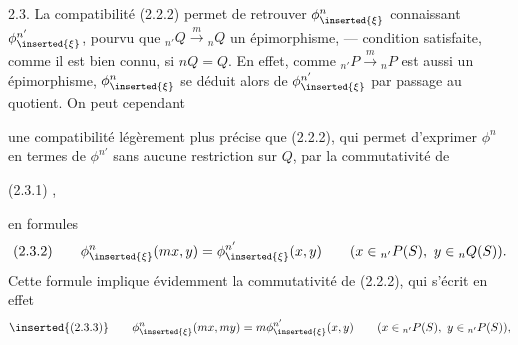2.3.  La compatibilité (2.2.2) permet de retrouver $\phi^n_{\inserted{\xi}}$ connaissant $\phi^{n'}_{\inserted{\xi}}$, pourvu que ${}_{n'}Q\xrightarrow{m}{}_nQ$  un épimorphisme, ---  condition satisfaite, comme il est bien connu, si $nQ=Q$. En effet, comme ${}_{n'}P\xrightarrow{m}{}_nP$ est aussi un épimorphisme, $\phi^n_{\inserted{\xi}}$ se déduit alors de $\phi^{n'}_{\inserted{\xi}}$ par passage au quotient. On peut cependant \rule{0pt}{4ex} une compatibilité légèrement plus précise que (2.2.2), qui permet d'exprimer $\phi^n$ en termes de $\phi^{n'}$ sans aucune restriction sur $Q$, par la commutativité de

(2.3.1)
,

en formules
\[
(2.3.2)\qquad
\phi^n_{\inserted{\xi}}(mx,y)=\phi^{n'}_{\inserted{\xi}}(x,y)
\qquad(x\in{}_{n'}P(S),\ y\in{}_nQ(S)).
\]
Cette formule implique évidemment la commutativité de (2.2.2), qui s'écrit en effet
\[
\inserted{(2.3.3)}\qquad
\phi^n_{\inserted{\xi}}(mx,my)=m\phi^{n'}_{\inserted{\xi}}(x,y)
\qquad(x\in{}_{n'}P(S),\ y\in{}_{n'}P(S)),
\]
